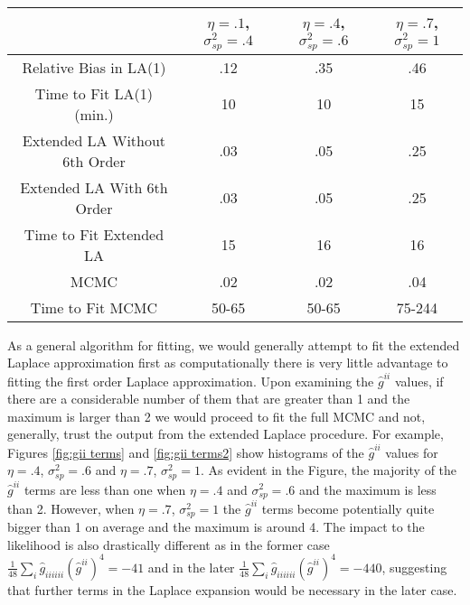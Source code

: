 \documentclass[11pt]{isuthesis}
\begin{document}
	\begin{table}[h]
		\begin{center}
			\begin{tabular}{ |c|c|c|c| } 
				\hline
				& $\eta=.1$, $\sigma_{sp}^2=.4$&$\eta=.4$, $\sigma_{sp}^2=.6$& $\eta=.7$, $\sigma_{sp}^2=1$\\
				\hline
				Relative Bias in LA(1) & .12 & .35 & .46\\ 
				Time to Fit LA(1) (min.)& 10 & 10 & 15\\
				\hline
				Extended LA Without 6th Order & .03 & .05 & .25\\
				Extended LA With 6th Order& .03 & .05 & .25\\
				Time to Fit Extended LA & 15 & 16 &  16\\
				\hline
				MCMC & .02 & .02 & .04\\
				Time to Fit MCMC  & 50-65 & 50-65 & 75-244\\
				\hline
			\end{tabular}
		\end{center}
		\label{Simulations}
	\end{table}
	  As a general algorithm for fitting, we would generally attempt to fit the extended Laplace approximation first as computationally there is very little advantage to fitting the first order Laplace approximation.  Upon examining the $\hat{g}^{ii}$ values, if there are a considerable number of them that are greater than 1 and the maximum is larger than 2 we would proceed to fit the full MCMC and not, generally, trust the output from the extended Laplace procedure.  For example, Figures \ref{fig:gii terms} and \ref{fig:gii terms2} show histograms of the $\hat{g}^{ii}$ values for $\eta=.4$, $\sigma_{sp}^2=.6$ and $\eta=.7$, $\sigma_{sp}^2=1$.  As evident in the Figure, the majority of the $\hat{g}^{ii}$ terms are less than one when $\eta=.4$ and $\sigma_{sp}^2=.6$ and the maximum is less than 2.  However, when $\eta=.7$, $\sigma_{sp}^2=1$  the $\hat{g}^{ii}$ terms become potentially quite bigger than 1 on average and the maximum is around 4.  The impact to the likelihood is also drastically different as in the former case $\frac{1}{48}\sum_{i}\hat{g}_{iiiiii}(\hat{g}^{ii})^4=-41$ and in the later $\frac{1}{48}\sum_{i}\hat{g}_{iiiiii}(\hat{g}^{ii})^4=-440$, suggesting that further terms in the Laplace expansion would be necessary in the later case.
	
\end{document}
